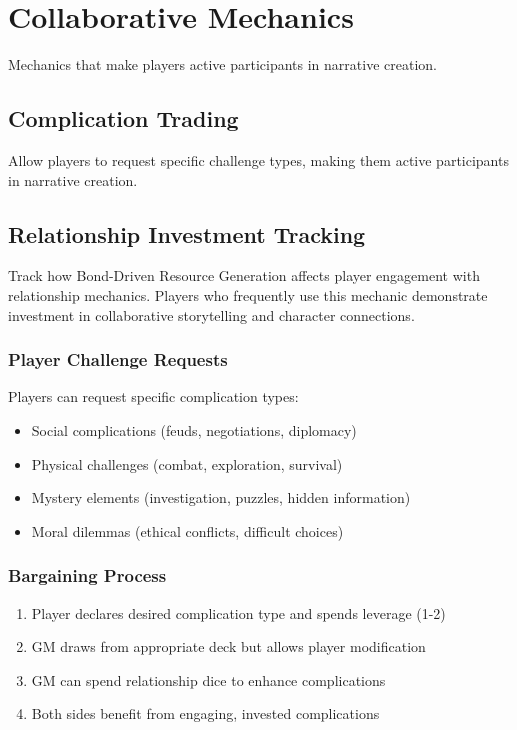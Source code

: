 \section{Collaborative Mechanics}

Mechanics that make players active participants in narrative creation.

\subsection{Complication Trading}

Allow players to request specific challenge types, making them active participants in narrative creation.

\subsection{Relationship Investment Tracking}
Track how Bond-Driven Resource Generation affects player engagement with relationship mechanics. Players who frequently use this mechanic demonstrate investment in collaborative storytelling and character connections.

\subsubsection{Player Challenge Requests}

Players can request specific complication types:
\begin{itemize}
\item Social complications (feuds, negotiations, diplomacy)
\item Physical challenges (combat, exploration, survival)
\item Mystery elements (investigation, puzzles, hidden information)
\item Moral dilemmas (ethical conflicts, difficult choices)
\end{itemize}

\subsubsection{Bargaining Process}

\begin{enumerate}
\item Player declares desired complication type and spends leverage (1-2)
\item GM draws from appropriate deck but allows player modification
\item GM can spend relationship dice to enhance complications
\item Both sides benefit from engaging, invested complications
\end{enumerate}

